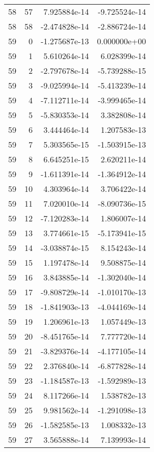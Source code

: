 \begin{tabular}{rrrr}
  58 &   57 &  7.925884e-14 & -9.725524e-14 \\
  58 &   58 & -2.474828e-14 & -2.886724e-14 \\
  59 &    0 & -1.275687e-13 &  0.000000e+00 \\
  59 &    1 &  5.610264e-14 &  6.028399e-14 \\
  59 &    2 & -2.797678e-14 & -5.739288e-15 \\
  59 &    3 & -9.025994e-14 & -5.413239e-14 \\
  59 &    4 & -7.112711e-14 & -3.999465e-14 \\
  59 &    5 & -5.830353e-14 &  3.382808e-14 \\
  59 &    6 &  3.444464e-14 &  1.207583e-13 \\
  59 &    7 &  5.303565e-15 & -1.503915e-13 \\
  59 &    8 &  6.645251e-15 &  2.620211e-14 \\
  59 &    9 & -1.611391e-14 & -1.364912e-14 \\
  59 &   10 &  4.303964e-14 &  3.706422e-14 \\
  59 &   11 &  7.020010e-14 & -8.090736e-15 \\
  59 &   12 & -7.120283e-14 &  1.806007e-14 \\
  59 &   13 &  3.774661e-15 & -5.173941e-15 \\
  59 &   14 & -3.038874e-15 &  8.154243e-14 \\
  59 &   15 &  1.197478e-14 &  9.508875e-14 \\
  59 &   16 &  3.843885e-14 & -1.302040e-14 \\
  59 &   17 & -9.808729e-14 & -1.010170e-13 \\
  59 &   18 & -1.841903e-13 & -4.044169e-14 \\
  59 &   19 &  1.206961e-13 &  1.057449e-13 \\
  59 &   20 & -8.451765e-14 &  7.777720e-14 \\
  59 &   21 & -3.829376e-14 & -4.177105e-14 \\
  59 &   22 &  2.376840e-14 & -6.877828e-14 \\
  59 &   23 & -1.184587e-13 & -1.592989e-13 \\
  59 &   24 &  8.117266e-14 &  1.538782e-13 \\
  59 &   25 &  9.981562e-14 & -1.291098e-13 \\
  59 &   26 & -1.582585e-13 &  1.008332e-13 \\
  59 &   27 &  3.565888e-14 &  7.139993e-14 \\

\end{tabular}
